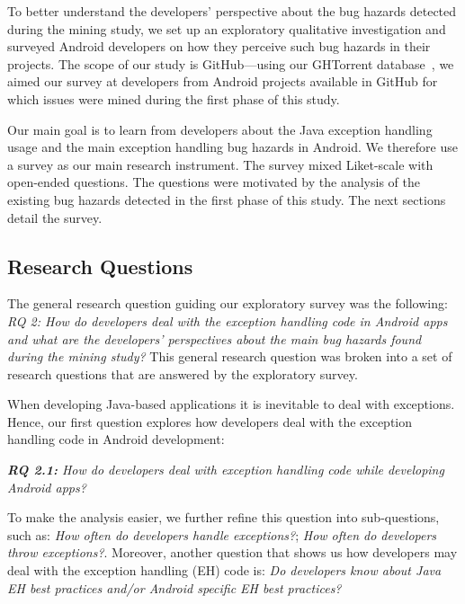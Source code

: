 To better understand the developers' perspective about the bug hazards detected during the mining study, we set up an exploratory qualitative investigation and surveyed Android developers on how they perceive such bug hazards in their projects. The scope of our study is GitHub---using our GHTorrent database~\cite{Gousi13}, we aimed our survey at developers from Android projects available in GitHub for which issues were mined during the first phase of this study. 

Our main goal is to learn from developers about the Java exception handling usage and the main exception handling bug hazards in Android. We therefore use a survey as our main research instrument. The survey mixed  Liket-scale with open-ended questions. The questions were motivated by the analysis of the existing bug hazards detected in the first phase of this study. The next sections detail the survey.



\subsection{Research Questions}

The general research question guiding our exploratory survey was the following: \emph{RQ 2: How do developers deal with the exception handling code in Android apps and what are the developers' perspectives about the main bug hazards found during the mining study?} This general research question was broken into a set of research questions that are answered by the exploratory survey.

When developing Java-based applications it is inevitable to deal with exceptions. Hence, our first question explores how developers deal with the exception handling code in Android development:

\emph{\textbf{RQ 2.1:} How do developers deal with exception handling code while developing Android apps?} 

To make the analysis easier, we further refine this question into sub-questions, such as: \emph{How often do developers handle exceptions?}; \emph{How often do developers throw exceptions?}. Moreover, another question that shows us how developers may deal with the exception handling (EH) code is: \emph{Do developers know about Java EH best practices and/or Android specific EH best practices?}
 
